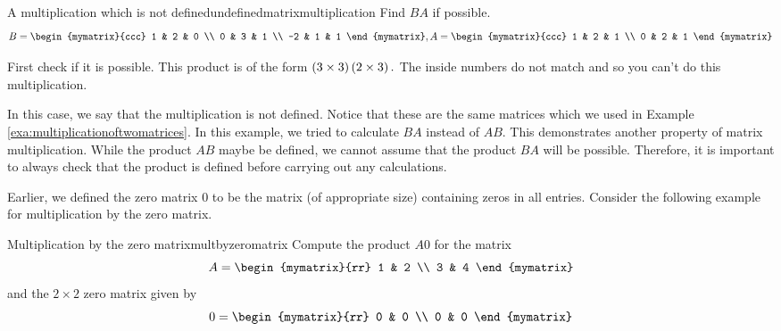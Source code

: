 \begin{example}{A multiplication which is not defined}{undefinedmatrixmultiplication}
Find $BA$ if possible.
\begin{equation*}
B = \begin{mymatrix}{ccc}
1 & 2 & 0 \\
0 & 3 & 1 \\
-2 & 1 & 1
\end{mymatrix},  A = \begin{mymatrix}{ccc}
1 & 2 & 1 \\
0 & 2 & 1
\end{mymatrix}
\end{equation*}
\end{example}

\begin{solution} First check if it is possible. This product is of the form $\left(3\times 3\right)
\left(2\times 3\right) .$ The inside numbers do not match and so you can't
do this multiplication. 
\end{solution}

In this case, we say that the multiplication is not defined. 
Notice that these are the same matrices which we used in Example \ref{exa:multiplicationoftwomatrices}.
In this example, we tried to calculate $BA$ instead of $AB$. This demonstrates another property 
of matrix multiplication. While the product $AB$ maybe be defined, we cannot assume that
the product $BA$ will be possible. Therefore, it is important to always check that the product is defined
before carrying out any calculations.

Earlier, we defined the zero matrix $0$ to be the matrix (of
appropriate size) containing zeros in all entries.  Consider the
following example for multiplication by the zero matrix.

\begin{example}{Multiplication by the zero matrix}{multbyzeromatrix}
Compute the product $A0$ for the matrix
\begin{equation*}
A=
\begin{mymatrix}{rr}
1 & 2 \\
3 & 4
\end{mymatrix}
\end{equation*}
and the $2 \times 2$ zero matrix given by
\begin{equation*}
0=
\begin{mymatrix}{rr}
0 & 0 \\
0 & 0
\end{mymatrix}
\end{equation*}
\end{example}

